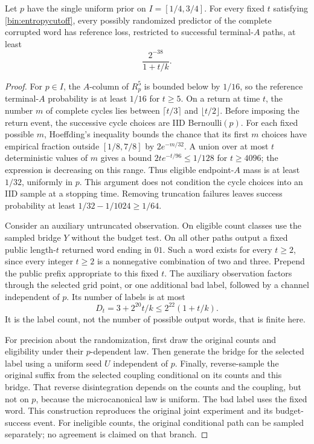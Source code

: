 \begin{lemma}
\label{bin:smallball}
Let $p$ have the single uniform prior on $I=[1/4,3/4]$. For every fixed $t$ satisfying \eqref{bin:entropycutoff}, every possibly randomized predictor of the complete corrupted word has reference loss, restricted to successful terminal-$A$ paths, at least
\begin{equation}
 \frac{2^{-38}}{1+t/k}.
 \label{bin:referencelower}
\end{equation}
\end{lemma}
\begin{proof}
For $p\in I$, the $A$-column of $R_p^5$ is bounded below by $1/16$, so the reference terminal-$A$ probability is at least $1/16$ for $t\ge5$. On a return at time $t$, the number $m$ of complete cycles lies between $\lceil t/3\rceil$ and $\lfloor t/2\rfloor$. Before imposing the return event, the successive cycle choices are IID Bernoulli$(p)$. For each fixed possible $m$, Hoeffding's inequality bounds the chance that its first $m$ choices have empirical fraction outside $[1/8,7/8]$ by $2e^{-m/32}$. A union over at most $t$ deterministic values of $m$ gives a bound $2t e^{-t/96}\le1/128$ for $t\ge4096$; the expression is decreasing on this range. Thus eligible endpoint-$A$ mass is at least $1/32$, uniformly in $p$. This argument does not condition the cycle choices into an IID sample at a stopping time. Removing truncation failures leaves success probability at least $1/32-1/1024\ge1/64$.

Consider an auxiliary untruncated observation. On eligible count classes use the sampled bridge $Y$ without the budget test. On all other paths output a fixed public length-$t$ returned word ending in $01$. Such a word exists for every $t\ge2$, since every integer $t\ge2$ is a nonnegative combination of two and three. Prepend the public prefix appropriate to this fixed $t$. The auxiliary observation factors through the selected grid point, or one additional bad label, followed by a channel independent of $p$. Its number of labels is at most
\begin{equation}
 D_t=3+2^{20}t/k\le2^{22}(1+t/k).
 \label{bin:labels}
\end{equation}
It is the label count, not the number of possible output words, that is finite here.

For precision about the randomization, first draw the original counts and eligibility under their $p$-dependent law. Then generate the bridge for the selected label using a uniform seed $U$ independent of $p$. Finally, reverse-sample the original suffix from the selected coupling conditional on its counts and this bridge. That reverse disintegration depends on the counts and the coupling, but not on $p$, because the microcanonical law is uniform. The bad label uses the fixed word. This construction reproduces the original joint experiment and its budget-success event. For ineligible counts, the original conditional path can be sampled separately; no agreement is claimed on that branch.


\end{proof}
